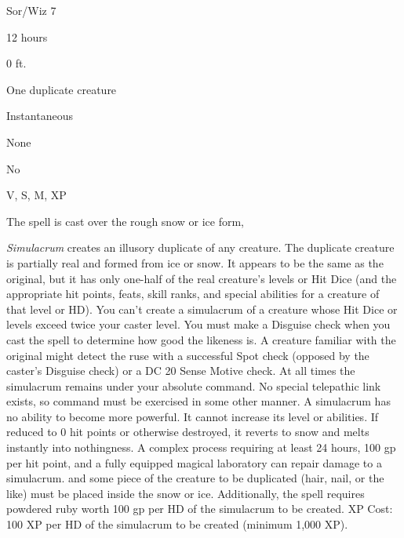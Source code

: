 
\begin{description*}
\item[Level:] Sor/Wiz 7
\item[Casting Time:] 12 hours
\item[Range:] 0 ft.
\item[Effect:] One duplicate creature
\item[Duration:] Instantaneous
\item[Saving Throw:] None
\item[Spell Resistance:] No
\item[Components:] V, S, M, XP
\item[Arcane Material Component:] The spell is cast over the rough snow or ice form,
\end{description*}

\textit{Simulacrum} creates an illusory duplicate of any creature. The duplicate
creature is partially real and formed from ice or snow. It appears to be the same
as the original, but it has only one-half of the real creature's levels or Hit
Dice (and the appropriate hit points, feats, skill ranks, and special abilities
for a creature of that level or HD). You can't create a simulacrum of a creature
whose Hit Dice or levels exceed twice your caster level. You must make a Disguise
check when you cast the spell to determine how good the likeness is. A creature
familiar with the original might detect the ruse with a successful Spot check (opposed
by the caster's Disguise check) or a DC 20 Sense Motive check.
At all times the simulacrum remains under your absolute command. No special telepathic
link exists, so command must be exercised in some other manner. A simulacrum has
no ability to become more powerful. It cannot increase its level or abilities.
If reduced to 0 hit points or otherwise destroyed, it reverts to snow and melts
instantly into nothingness. A complex process requiring at least 24 hours, 100
gp per hit point, and a fully equipped magical laboratory can repair damage to
a simulacrum.
and some piece of the creature to be duplicated (hair, nail, or the like) must
be placed inside the snow or ice. Additionally, the spell requires powdered ruby
worth 100 gp per HD of the simulacrum to be created.
XP Cost: 100 XP per HD of the simulacrum to be created (minimum 1,000
XP).